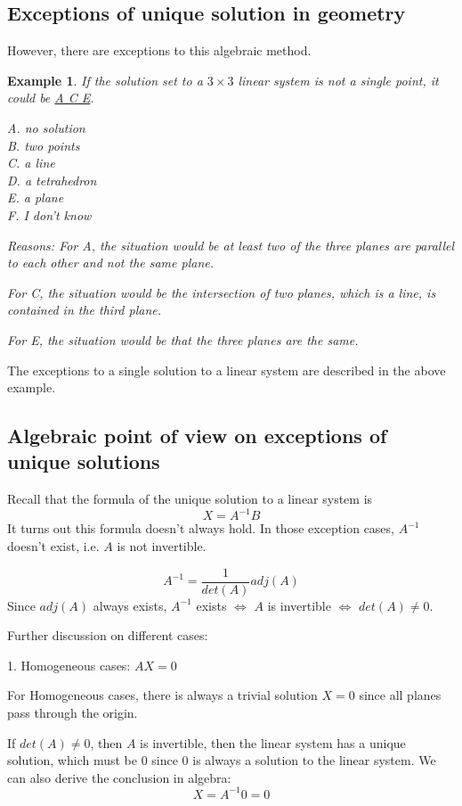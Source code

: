 \documentclass{article}
\newtheorem{example}{Example}
\begin{document}
\subsection{Exceptions of unique solution in geometry}

However, there are exceptions to this algebraic method.
\begin{example}
  If the solution set to a $3 \times 3$ linear system is not a single point, it 
  could be \underline{A C E}.

  A. no solution \\
  B. two points \\
  C. a line \\
  D. a tetrahedron \\
  E. a plane \\
  F. I don't know

  Reasons:
  For A, the situation would be at least two of the three planes are parallel to 
  each other and not the same plane.

  For C, the situation would be the intersection of two planes, which is a line, 
  is contained in the third plane.

  For E, the situation would be that the three planes are the same.
\end{example}
The exceptions to a single solution to a linear system are described in the 
above example.

\subsection{Algebraic point of view on exceptions of unique solutions}

Recall that the formula of the unique solution to a linear system is
\[
  X = A^{-1}B
\]
It turns out this formula doesn't always hold. In those exception cases, 
$A^{-1}$ doesn't exist, i.e. $A$ is not invertible.

\[
  A^{-1} = \frac{1}{det(A)}adj(A)
\]
Since $adj(A)$ always exists, $A^{-1}$ exists $\iff$ $A$ is invertible $\iff$ 
$det(A) \neq 0$.

\bigskip

Further discussion on different cases:

1. Homogeneous cases: $AX = 0$

For Homogeneous cases, there is always a trivial solution $X = 0$ since all 
planes pass through the origin.

If $det(A) \neq 0$, then $A$ is invertible, then the linear system has a unique 
solution, which must be $0$ since $0$ is always a solution to the linear 
system. We can also derive the conclusion in algebra:
\[
  X = A^{-1}0 = 0
\]
\end{document}
